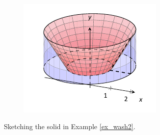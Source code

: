 \begin{solution}
{\begin{figure}[H]
\begin{subfigure}[t]{0.33\textwidth}
			\includegraphics[width=\textwidth]{figures/figwash2c}
			\label{fig:figwash2c}
			\caption{}    
		\end{subfigure} 
	\caption{Sketching the solid in Example \ref{ex_wash2}. \label{fig:wash2}}
\end{figure}	


}
\end{solution}
